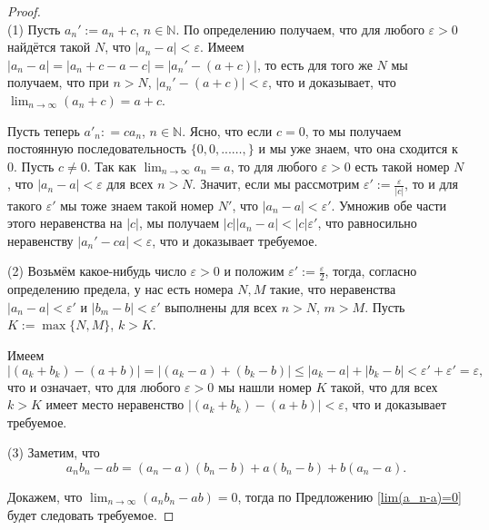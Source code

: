 \begin{proof}~\\
    (1) Пусть $a_n':=a_n+c$, $n\in \mathbb{N}$. По определению получаем, что для любого $\varepsilon > 0$ найдётся такой $N$, что $|a_n - a| < \varepsilon$. Имеем $|a_n -a| = |a_n+c - a - c| = |a_n' - (a+c)|$, то есть для того же $N$ мы получаем, что при $n>N$, $|a_n' - (a+c)| < \varepsilon$, что и доказывает, что $\lim_{n\to \infty}(a_n + c) = a+c$.

    Пусть теперь $a'_n: = ca_n$, $n\in \mathbb{N}$. Ясно, что если $c =0$, то мы получаем постоянную последовательность $\{0,0,...\ldots,\}$ и мы уже знаем, что она сходится к $0.$ Пусть $c \ne 0.$ Так как $\lim_{n\to \infty}a_n = a$, то для любого $\varepsilon>0$ есть такой номер $N$, что $|a_n - a|<\varepsilon$ для всех $n>N$. Значит, если мы рассмотрим $\varepsilon':=\frac{\varepsilon}{|c|}$, то и для такого $\varepsilon'$ мы тоже знаем такой номер $N'$, что $|a_n - a|< \varepsilon'$. Умножив обе части этого неравенства на $|c|$, мы получаем $|c||a_n - a| <|c|\varepsilon'$, что равносильно неравенству $|a_n' - ca| < \varepsilon$, что и доказывает требуемое.

    (2) Возьмём какое-нибудь число $\varepsilon>0$ и положим $\varepsilon':= \frac{\varepsilon}{2}$, тогда, согласно определению предела, у нас есть номера $N,M$ такие, что неравенства $|a_n - a|< \varepsilon'$ и $|b_m - b|<\varepsilon'$ выполнены для всех $n>N$, $m>M$. Пусть $K:=\max\{N,M\}$, $k>K$.
    
    Имеем
    \[
     |(a_k + b_k) - (a+b)| = |(a_k-a) + (b_k-b)|\le |a_k-a| + |b_k-b| < \varepsilon' + \varepsilon' = \varepsilon,
    \]
    что и означает, что для любого $\varepsilon>0$ мы нашли номер $K$ такой, что для всех $k>K$ имеет место неравенство $|(a_k + b_k) - (a+b)|< \varepsilon$, что и доказывает требуемое.

    (3) Заметим, что 
    \[
    a_nb_n - ab = (a_n-a)(b_n-b) + a(b_n -b) + b(a_n -a).
    \]

    Докажем, что $\lim_{n\to \infty}(a_nb_n - ab) = 0$, тогда по Предложению \ref{lim(a_n-a)=0} будет следовать требуемое.


\end{proof}

